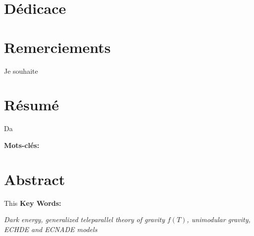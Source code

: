\documentclass[a4paper,12pt]{report}
\theoremstyle{plain}
\theoremstyle{plain}
\begin{document}
\chapter*{D\'edicace}

\vspace*{5.cm}
\begin{center}
\begin{flushleft}
\hspace{0.25cm}{\itshape \`A 

 ma M\`ere KOUDOGBO Hou\'edassi\\
pour  son engagement face \`a ses responsabilit\'es dans mon \'education}
\end{flushleft}
\end{center}




\chapter*{Remerciements}
Je souhaite 
 
 
 

\chapter*{R\'esum\'e}
Da


 \textbf{Mots-cl\'es: }
  
 \emph{}

\chapter*{Abstract}
This 
 \textbf{Key Words: }
  
 \emph{Dark energy, generalized teleparallel theory of gravity $f(T)$, unimodular gravity,  ECHDE and ECNADE models}



\tableofcontents



\listoffigures





% 
\end{document}
